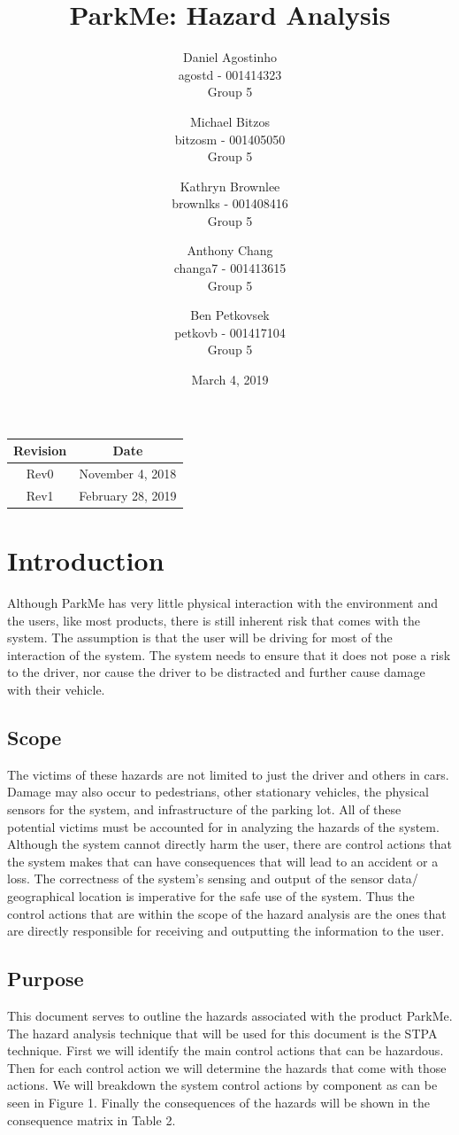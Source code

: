 \documentclass[]{article}
\title{ParkMe: Hazard Analysis}
\author{Daniel Agostinho\\agostd - 001414323\\ Group 5 \and Michael Bitzos\\bitzosm - 001405050\\ Group 5 \and Kathryn Brownlee\\brownlks - 001408416\\ Group 5  \and Anthony Chang\\changa7 - 001413615\\ Group 5 \and Ben Petkovsek\\petkovb - 001417104\\ Group 5}
\begin{document}
\date{March 4, 2019}
\maketitle
\begin{center}
\begin{table}[b]
\centering
\begin{tabular}{|c|c|}
 \hline
 Revision & Date \\ 
 \hline
 Rev0 & November 4, 2018 \\ 
 Rev1 & February 28, 2019 \\ 
 \hline
\end{tabular}
\end{table}
\end{center}
\newpage
\tableofcontents
\newpage
\listoffigures
\listoftables
\newpage

\captionsetup{font=bf}

\section{Introduction}
Although ParkMe has very little physical interaction with the environment and the users, like most products, there is still inherent risk that comes with the system. The assumption is that the user will be driving for most of the interaction of the system. The system needs to ensure that it does not pose a risk to the driver, nor cause the driver to be distracted and further cause damage with their vehicle.


\subsection{Scope}
The victims of these hazards are not limited to just the driver and others in cars. Damage may also occur to pedestrians, other stationary vehicles, the physical sensors for the system, and infrastructure of the parking lot. All of these potential victims must be accounted for in analyzing the hazards of the system. Although the system cannot directly harm the user, there are control actions that the system makes that can have consequences that will lead to an accident or a loss. The correctness of the system’s sensing and output of the sensor data/ geographical location is imperative for the safe use of the system. Thus the control actions that are within the scope of the hazard analysis are the ones that are directly responsible for receiving and outputting the information to the user.


\subsection{Purpose}
This document serves to outline the hazards associated with the product ParkMe. The hazard analysis technique that will be used for this document is the STPA technique. First we will identify the main control actions that can be hazardous. Then for each control action we will determine the hazards that come with those actions. We will breakdown the system control actions by component as can be seen in Figure 1. Finally the consequences of the hazards will be shown in the consequence matrix in Table 2.
\end{document}

